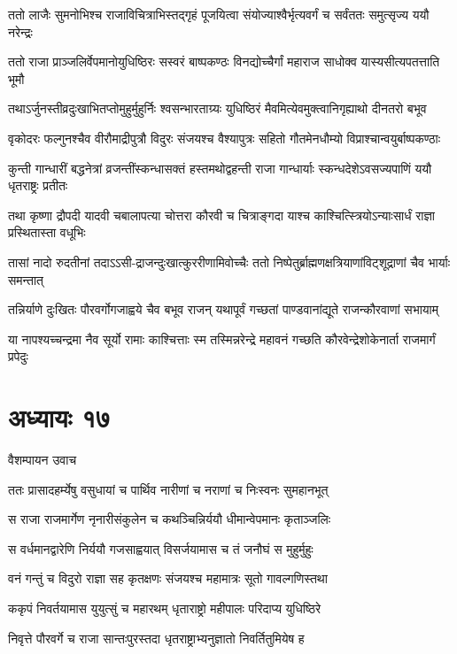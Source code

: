 \twolineshloka
{ततो लाजैः सुमनोभिश्च राजाविचित्राभिस्तद्गृहं पूजयित्वा}
{संयोज्याश्वैर्भृत्यवर्गं च सर्वंततः समुत्सृज्य ययौ नरेन्द्रः}


\twolineshloka
{ततो राजा प्राञ्जलिर्वेपमानोयुधिष्ठिरः सस्वरं बाष्पकण्ठः}
{विनद्योच्चैर्गां महाराज साधोक्व यास्यसीत्यपतत्ताति भूमौ}


\twolineshloka
{तथाऽर्जुनस्तीव्रदुःखाभितप्तोमुहुर्मुहुर्निः श्वसन्भारताग्र्यः}
{युधिष्ठिरं मैवमित्येवमुक्त्वानिगृह्याथो दीनतरो बभूव}


\twolineshloka
{वृकोदरः फल्गुनश्चैव वीरौमाद्रीपुत्रौ विदुरः संजयश्च}
{वैश्यापुत्रः सहितो गौतमेनधौम्यो विप्राश्चान्वयुर्बाष्पकण्ठाः}


\twolineshloka
{कुन्ती गान्धारीं बद्धनेत्रां व्रजन्तींस्कन्धासक्तं हस्तमथोद्वहन्ती}
{राजा गान्धार्याः स्कन्धदेशेऽवसज्यपाणिं ययौ धृतराष्ट्रः प्रतीतः}


\twolineshloka
{तथा कृष्णा द्रौपदी यादवी चबालापत्या चोत्तरा कौरवी च}
{चित्राङ्गदा याश्च काश्चित्स्त्रियोऽन्याःसार्धं राज्ञा प्रस्थितास्ता वधूभिः}


\twolineshloka
{तासां नादो रुदतीनां तदाऽऽसी-द्राजन्दुःखात्कुररीणामिवोच्चैः}
{ततो निष्पेतुर्ब्राह्मणक्षत्रियाणांविट्शूद्राणां चैव भार्याः समन्तात्}


\twolineshloka
{तन्निर्याणे दुःखितः पौरवर्गोगजाह्वये चैव बभूव राजन्}
{यथापूर्वं गच्छतां पाण्डवानांद्यूते राजन्कौरवाणां सभायाम्}


\twolineshloka
{या नापश्यच्चन्द्रमा नैव सूर्यो रामाः काश्चित्ताः स्म तस्मिन्नरेन्द्रे}
{महावनं गच्छति कौरवेन्द्रेशोकेनार्ता राजमार्गं प्रपेदुः}


\chapter{अध्यायः १७}
\twolineshloka
{वैशम्पायन उवाच}
{}


\twolineshloka
{ततः प्रासादहर्म्येषु वसुधायां च पार्थिव}
{नारीणां च नराणां च निःस्वनः सुमहानभूत्}


\twolineshloka
{स राजा राजमार्गेण नृनारीसंकुलेन च}
{कथञ्चिन्निर्ययौ धीमान्वेपमानः कृताञ्जलिः}


\twolineshloka
{स वर्धमानद्वारेणि निर्ययौ गजसाह्वयात्}
{विसर्जयामास च तं जनौघं स मुहुर्मुहुः}


\twolineshloka
{वनं गन्तुं च विदुरो राज्ञा सह कृतक्षणः}
{संजयश्च महामात्रः सूतो गावल्गणिस्तथा}


\twolineshloka
{ककृपं निवर्तयामास युयुत्सुं च महारथम्}
{धृताराष्ट्रो महीपालः परिदाप्य युधिष्ठिरे}


\twolineshloka
{निवृत्ते पौरवर्गे च राजा सान्तःपुरस्तदा}
{धृतराष्ट्राभ्यनुज्ञातो निवर्तितुमियेष ह}


